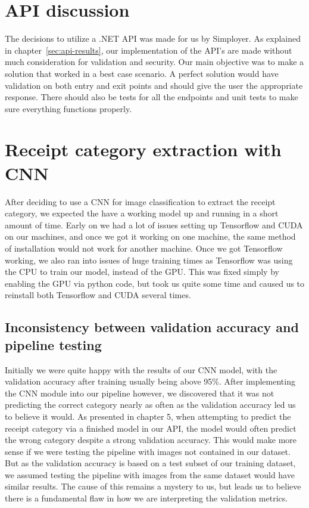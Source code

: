 \section{API discussion}\label{sec:api-discussion}
The decisions to utilize a .NET API was made for us by Simployer.
As explained in chapter~\ref{sec:api-results}, our implementation of the API's are made without much consideration
for validation and security.
Our main objective was to make a solution that worked in a best case scenario.
A perfect solution would have validation on both entry and exit points and should give the user the appropriate
response.
There should also be tests for all the endpoints and unit tests to make sure everything functions properly.

\section{Receipt category extraction with CNN}\label{sec:receipt-category-extraction-with-cnn}
After deciding to use a CNN for image classification to extract the receipt category, we expected the have a working model up and running in a short amount of time.
Early on we had a lot of issues setting up Tensorflow and CUDA on our machines, and once we got it working on one machine, the same method of installation would not work for another machine.
Once we got Tensorflow working, we also ran into issues of huge training times as Tensorflow was using the CPU to train our model, instead of the GPU.
This was fixed simply by enabling the GPU via python code, but took us quite some time and caused us to reinstall both Tensorflow and CUDA several times.

\subsection{Inconsistency between validation accuracy and pipeline testing}\label{subsec:inconsistency-between-validation-accuracy-and-pipeline-testing}
Initially we were quite happy with the results of our CNN model, with the validation accuracy after training usually being above 95\%.
After implementing the CNN module into our pipeline however, we discovered that it was not predicting the correct category nearly as often as the validation accuracy led us to believe it would.
As presented in chapter 5, when attempting to predict the receipt category via a finished model in our API, the model would often predict the wrong category despite a strong validation accuracy.
This would make more sense if we were testing the pipeline with images not contained in our dataset.
But as the validation accuracy is based on a test subset of our training dataset, we assumed testing the pipeline with images from the same dataset would have similar results.
The cause of this remains a mystery to us, but leads us to believe there is a fundamental flaw in how we are interpreting the validation metrics.

